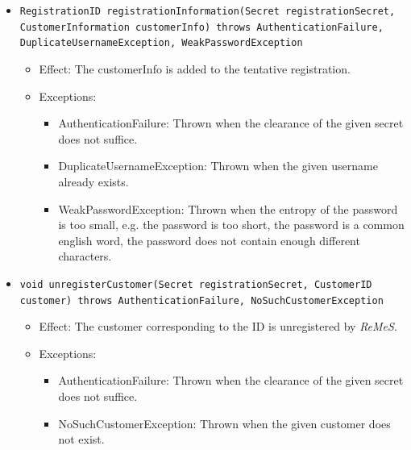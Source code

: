 \documentclass[a4paper,10pt]{article}
\newcommand{\rem}{\emph{ReMeS}\xspace}
\begin{document}
\begin{itemize}
\begin{itemize}
        \item \texttt{RegistrationID registrationInformation(Secret registrationSecret, CustomerInformation customerInfo) throws AuthenticationFailure, DuplicateUsernameException, WeakPasswordException}
        \begin{itemize}
            \item Effect: The customerInfo is added to the tentative registration.
            \item Exceptions:
            \begin{itemize}
            	\item AuthenticationFailure: Thrown when the clearance of the given secret does not suffice.
                \item DuplicateUsernameException: Thrown when the given username already exists.
                \item WeakPasswordException: Thrown when the entropy of the password is too small, e.g. the password is too short, the password is a common english word, the password does not contain enough different characters.
            \end{itemize}
        \end{itemize}
        \item \texttt{void unregisterCustomer(Secret registrationSecret, CustomerID customer) throws AuthenticationFailure, NoSuchCustomerException}
        \begin{itemize}
            \item Effect: The customer corresponding to the ID is unregistered by \rem.
            \item Exceptions:
            \begin{itemize}
            	\item AuthenticationFailure: Thrown when the clearance of the given secret does not suffice.
                \item NoSuchCustomerException: Thrown when the given customer does not exist.
            \end{itemize}
        \end{itemize}
    \end{itemize}
    

\end{itemize}
\end{document}
